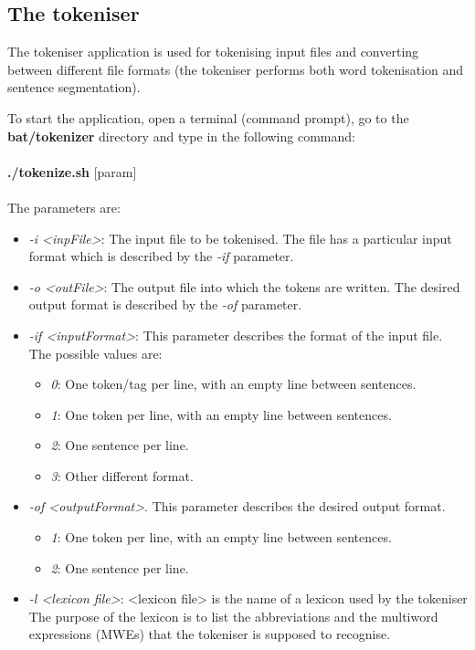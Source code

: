 \documentclass[11pt]{article}
\begin{document}
\subsection{The tokeniser}
\label{sec:tok}
The tokeniser application is used for tokenising input files and converting between different file formats (the tokeniser performs both word tokenisation and sentence segmentation).

To start the application, open a terminal (command prompt), go to the \textbf{bat/tokenizer} directory and type in the following command:\\ \\
{\bf ./tokenize.sh} [param] \\ \\
The parameters are:
\begin{itemize}
\item \emph{-i <inpFile>}: The input file to be tokenised. The file has a particular input format which is described by the \emph{-if} parameter.
\item \emph{-o <outFile>}: The output file into which the tokens are written. The desired output format is described by the \emph{-of} parameter.
\item \emph{-if <inputFormat>}: This parameter describes the format of the input file.
The possible values are:
\begin{itemize}
\item \emph{0}: One token/tag per line, with an empty line between sentences.
\item \emph{1}: One token per line, with an empty line between sentences.
\item \emph{2}: One sentence per line.
\item \emph{3}: Other different format.
\end{itemize}
\item \emph{-of <outputFormat>}. This parameter describes the desired output format.
\begin{itemize}
\item \emph{1}: One token per line, with an empty line between sentences.
\item \emph{2}: One sentence per line.
\end{itemize}
\item \emph{-l <lexicon file>}: <lexicon file> is the name of a lexicon used by the tokeniser 
The purpose of the lexicon is to list the abbreviations and the multiword expressions (MWEs) that the tokeniser is supposed to recognise.

\end{itemize}
\end{document}

